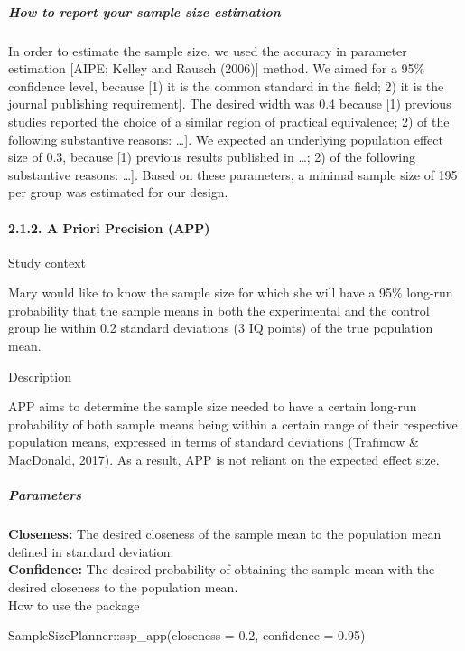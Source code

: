 \documentclass[
  english,
  man,floatsintext]{apa6}
\newenvironment{Shaded}{\begin{snugshade}}{\end{snugshade}}
\newcommand{\AttributeTok}[1]{\textcolor[rgb]{0.77,0.63,0.00}{#1}}
\newcommand{\FloatTok}[1]{\textcolor[rgb]{0.00,0.00,0.81}{#1}}
\newcommand{\FunctionTok}[1]{\textcolor[rgb]{0.00,0.00,0.00}{#1}}
\newcommand{\NormalTok}[1]{#1}
\newcommand{\SpecialCharTok}[1]{\textcolor[rgb]{0.00,0.00,0.00}{#1}}
\let\oldparagraph\paragraph
\renewcommand{\paragraph}[1]{\oldparagraph{#1}\mbox{}}
\let\oldsubparagraph\subparagraph
\renewcommand{\subparagraph}[1]{\oldsubparagraph{#1}\mbox{}}
\begin{document}
\hypertarget{how-to-report-your-sample-size-estimation-6}{%
\subparagraph{How to report your sample size estimation}\label{how-to-report-your-sample-size-estimation-6}}

In order to estimate the sample size, we used the accuracy in parameter estimation {[}AIPE; Kelley and Rausch (2006){]} method. We aimed for a 95\% confidence level, because {[}1) it is the common standard in the field; 2) it is the journal publishing requirement{]}. The desired width was 0.4 because {[}1) previous studies reported the choice of a similar region of practical equivalence; 2) of the following substantive reasons: \ldots{]}. We expected an underlying population effect size of 0.3, because {[}1) previous results published in \ldots; 2) of the following substantive reasons: \ldots{]}. Based on these parameters, a minimal sample size of 195 per group was estimated for our design.

\hypertarget{a-priori-precision-app}{%
\paragraph{2.1.2. A Priori Precision (APP)}\label{a-priori-precision-app}}

Study context

Mary would like to know the sample size for which she will have a 95\% long-run probability that the sample means in both the experimental and the control group lie within 0.2 standard deviations (3 IQ points) of the true population mean.

Description

APP aims to determine the sample size needed to have a certain long-run probability of both sample means being within a certain range of their respective population means, expressed in terms of standard deviations (Trafimow \& MacDonald, 2017). As a result, APP is not reliant on the expected effect size.

\hypertarget{parameters-7}{%
\subparagraph{Parameters}\label{parameters-7}}

\textbf{Closeness:} The desired closeness of the sample mean to the population mean defined in standard deviation.\\
\textbf{Confidence:} The desired probability of obtaining the sample mean with the desired closeness to the population mean.\\

How to use the package

\begin{Shaded}
\begin{Highlighting}[]
\NormalTok{SampleSizePlanner}\SpecialCharTok{::}\FunctionTok{ssp\_app}\NormalTok{(}\AttributeTok{closeness =} \FloatTok{0.2}\NormalTok{, }\AttributeTok{confidence =} \FloatTok{0.95}\NormalTok{)}
\end{Highlighting}
\end{Shaded}
\end{document}
